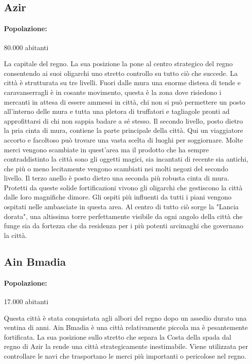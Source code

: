 \documentclass[letterpaper,twocolumn,openany,nodeprecatedcode]{dndbook}
\begin{document}
\subsection{Azir}
\paragraph{Popolazione:} 80.000 abitanti

La capitale del regno. La sua posizione la pone al centro strategico del regno consentendo ai suoi oligarchi uno stretto controllo su tutto ciò che succede.
La città è strutturata su tre livelli. Fuori dalle mura una enorme distesa di tende e caravanserragli è in cosante movimento, questa è la zona dove risiedono i mercanti in attesa di essere ammessi in città, chi non si può permettere un posto all'interno delle mura e tutta una pletora di truffatori e tagliagole pronti ad approfittarsi di chi non sappia badare a sé stesso.
Il secondo livello, posto dietro la pria cinta di mura, contiene la parte principale della città. Qui un viaggiatore accorto e facoltoso può trovare una vasta scelta di luoghi per soggiornare. Molte merci vengono scambiate in quest'area ma il prodotto che ha sempre contraddistinto la città sono gli oggetti magici, sia incantati di recente sia antichi, che più o meno lecitamente vengono scambiati nei molti negozi del secondo livello.
Il terzo anello è posto dietro una seconda più robusta cinta di mura. Protetti da queste solide fortificazioni vivono gli oligarchi che gestiscono la città dalle loro magnifiche dimore. Gli ospiti più influenti da tutti i piani vengono ospitati nelle ambasciate in questa area. Al centro di tutto ciò sorge la "Lancia dorata", una altissima torre perfettamente visibile da ogni angolo della città che funge sia da fortezza che da residenza per i più potenti arcimaghi che governano la città.

\subsection{Ain Bmadia}
\paragraph{Popolazione:} 17.000 abitanti

Questa città  è stata conquistata agli albori del regno dopo un assedio durato una ventina di anni. Ain Bmadia è una città relativamente piccola ma è pesantemente fortificata. La sua posizione sullo stretto che separa la Costa della spada dal regno di Azir la rende una città strategicamente inestimabile. Viene utilizzata per controllare le navi che trasportano le merci più importanti o pericolose nel regno.
\end{document}
